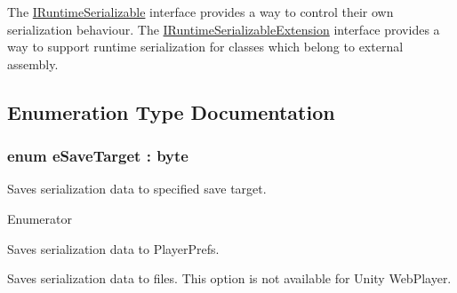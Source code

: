 The \hyperlink{interface_voxel_busters_1_1_runtime_serialization_1_1_i_runtime_serializable}{I\+Runtime\+Serializable} interface provides a way to control their own serialization behaviour. The \hyperlink{class_voxel_busters_1_1_runtime_serialization_1_1_i_runtime_serializable_extension}{I\+Runtime\+Serializable\+Extension} interface provides a way to support runtime serialization for classes which belong to external assembly. 

\subsection{Enumeration Type Documentation}
\hypertarget{namespace_voxel_busters_1_1_runtime_serialization_aacaa3008b2cb441fbe4708df854019bf}{}
\subsubsection[{e\+Save\+Target}]{\setlength{\rightskip}{0pt plus 5cm}enum {\bf e\+Save\+Target} \+: byte}\label{namespace_voxel_busters_1_1_runtime_serialization_aacaa3008b2cb441fbe4708df854019bf}


Saves serialization data to specified save target. 

\begin{Desc}
\item[Enumerator]\par
\begin{description}
\item[{\em 
\hypertarget{namespace_voxel_busters_1_1_runtime_serialization_aacaa3008b2cb441fbe4708df854019bfa4cc629b75d0db85993aaa1ceab89775e}{}P\+L\+A\+Y\+E\+R\+\_\+\+P\+R\+E\+F\+S\label{namespace_voxel_busters_1_1_runtime_serialization_aacaa3008b2cb441fbe4708df854019bfa4cc629b75d0db85993aaa1ceab89775e}
}]Saves serialization data to Player\+Prefs. \item[{\em 
\hypertarget{namespace_voxel_busters_1_1_runtime_serialization_aacaa3008b2cb441fbe4708df854019bfa47859e0cd44b283c0b013bb759600bf7}{}F\+I\+L\+E\+\_\+\+S\+Y\+S\+T\+E\+M\label{namespace_voxel_busters_1_1_runtime_serialization_aacaa3008b2cb441fbe4708df854019bfa47859e0cd44b283c0b013bb759600bf7}
}]Saves serialization data to files. This option is not available for Unity Web\+Player. \end{description}
\end{Desc}
